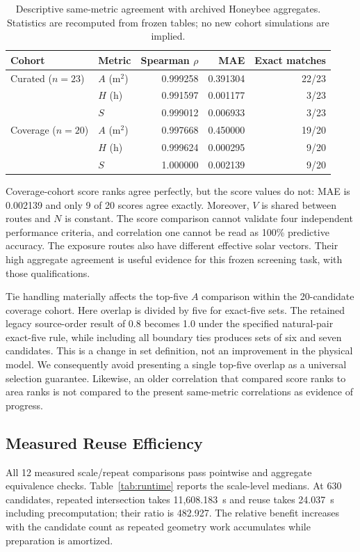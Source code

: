 \documentclass{llncs}
\begin{document}
\begin{table}[tbp]
\caption{Descriptive same-metric agreement with archived Honeybee aggregates. Statistics are recomputed from frozen tables; no new cohort simulations are implied.}
\label{tab:agreement}\centering
\begin{tabular}{llrrr}\toprule
Cohort & Metric & Spearman $\rho$ & MAE & Exact matches\\\midrule
Curated ($n=23$) & $A$ (m$^2$) & 0.999258 & 0.391304 & 22/23\\
 & $H$ (h) & 0.991597 & 0.001177 & 3/23\\
 & $S$ & 0.999012 & 0.006933 & 3/23\\
Coverage ($n=20$) & $A$ (m$^2$) & 0.997668 & 0.450000 & 19/20\\
 & $H$ (h) & 0.999624 & 0.000295 & 9/20\\
 & $S$ & 1.000000 & 0.002139 & 9/20\\\bottomrule
\end{tabular}
\end{table}

Coverage-cohort score ranks agree perfectly, but the score values do not: MAE is 0.002139 and only 9 of 20 scores agree exactly. Moreover, $V$ is shared between routes and $N$ is constant. The score comparison cannot validate four independent performance criteria, and correlation one cannot be read as 100\% predictive accuracy. The exposure routes also have different effective solar vectors. Their high aggregate agreement is useful evidence for this frozen screening task, with those qualifications.

Tie handling materially affects the top-five $A$ comparison within the 20-candidate coverage cohort. Here overlap is divided by five for exact-five sets. The retained legacy source-order result of 0.8 becomes 1.0 under the specified natural-pair exact-five rule, while including all boundary ties produces sets of six and seven candidates. This is a change in set definition, not an improvement in the physical model. We consequently avoid presenting a single top-five overlap as a universal selection guarantee. Likewise, an older correlation that compared score ranks to area ranks is not compared to the present same-metric correlations as evidence of progress.

\subsection{Measured Reuse Efficiency}
All 12 measured scale/repeat comparisons pass pointwise and aggregate equivalence checks. Table~\ref{tab:runtime} reports the scale-level medians. At 630 candidates, repeated intersection takes 11,608.183~s and reuse takes 24.037~s including precomputation; their ratio is 482.927. The relative benefit increases with the candidate count as repeated geometry work accumulates while preparation is amortized.
\end{document}
